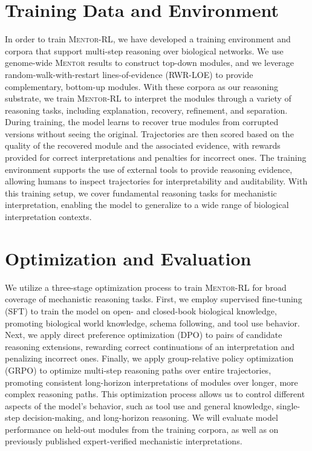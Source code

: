 \documentclass[letterpaper,11pt]{article}
\begin{document}
\section{Training Data and Environment}
In order to train \textsc{Mentor-RL}, we have developed a training environment and corpora that support multi-step reasoning over biological networks. We use genome-wide \textsc{Mentor} results to construct top-down modules, and we leverage random-walk-with-restart lines-of-evidence (RWR-LOE) to provide complementary, bottom-up modules. With these corpora as our reasoning substrate, we train \textsc{Mentor-RL} to interpret the modules through a variety of reasoning tasks, including explanation, recovery, refinement, and separation. During training, the model learns to recover true modules from corrupted versions without seeing the original. Trajectories are then scored based on the quality of the recovered module and the associated evidence, with rewards provided for correct interpretations and penalties for incorrect ones. The training environment supports the use of external tools to provide reasoning evidence, allowing humans to inspect trajectories for interpretability and auditability. With this training setup, we cover fundamental reasoning tasks for mechanistic interpretation, enabling the model to generalize to a wide range of biological interpretation contexts. 

\section{Optimization and Evaluation}
We utilize a three-stage optimization process to train \textsc{Mentor-RL} for broad coverage of mechanistic reasoning tasks. First, we employ supervised fine-tuning (SFT) to train the model on open- and closed-book biological knowledge, promoting biological world knowledge, schema following, and tool use behavior. Next, we apply direct preference optimization (DPO) to pairs of candidate reasoning extensions, rewarding correct continuations of an interpretation and penalizing incorrect ones. Finally, we apply group-relative policy optimization (GRPO) to optimize multi-step reasoning paths over entire trajectories, promoting consistent long-horizon interpretations of modules over longer, more complex reasoning paths. This optimization process allows us to control different aspects of the model's behavior, such as tool use and general knowledge, single-step decision-making, and long-horizon reasoning. We will evaluate model performance on held-out modules from the training corpora, as well as on previously published expert-verified mechanistic interpretations.
\end{document}
